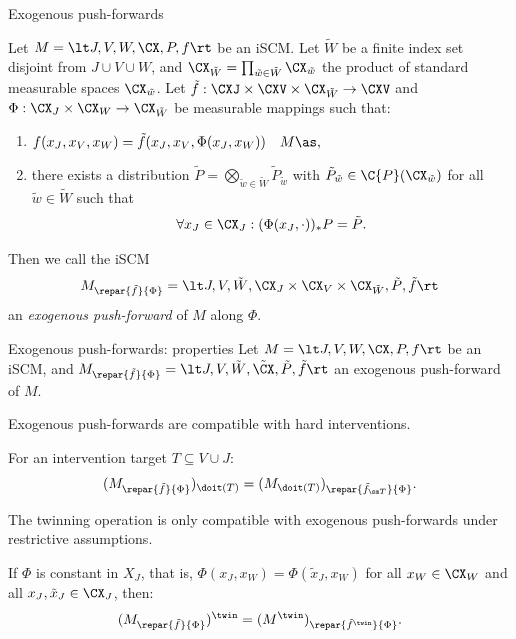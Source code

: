 \begin{frame}{Exogenous push-forwards}
\begin{Def}[\ref{def:exogenous_pushforward}]
  Let $M = \lt J, V, W, \CX, P, f \rt$ be an iSCM.
  Let $\tilde{W}$ be a finite index set disjoint from $J \cup V \cup W$, and
  $\CX_{\tilde{W}} = \prod_{\tilde{w}\in\tilde{W}} \CX_{\tilde{w}}$ the product of standard measurable spaces $\CX_{\tilde{w}}$. 
  Let $\tilde{f} : \CXJ \times \CXV \times \CX_{\tilde{W}} \to \CXV$ and $\Phi : \CX_J \times \CX_W \to \CX_{\tilde{W}}$ be measurable mappings such that:
  \begin{enumerate}
    \item $f(x_J,x_V,x_W) = \tilde{f}(x_J,x_V,\Phi(x_J,x_W)) \quad M\as,$
    \item there exists a distribution $\tilde{P} = \bigotimes_{\tilde{w}\in\tilde{W}} \tilde{P}_{\tilde{w}}$ with $\tilde{P}_{\tilde{w}} \in \C{P}(\CX_{\tilde{w}})$ for all $\tilde{w}\in\tilde{W}$ such that
    $$\forall x_J \in \CX_J: (\Phi(x_J,\cdot))_* P = \tilde{P}.$$
  \end{enumerate}
  Then we call the iSCM
  $$M_{\repar{\tilde{f}}{\Phi}} = \lt J, V, \tilde{W}, \CX_J \times \CX_V \times \CX_{\tilde{W}}, \tilde{P}, \tilde{f} \rt$$
  an \emph{exogenous push-forward} of $M$ along $\Phi$.
\end{Def}
\end{frame}

\begin{frame}{Exogenous push-forwards: properties}
Let $M = \lt J, V, W, \CX, P, f \rt$ be an iSCM, and $M_{\repar{\tilde{f}}{\Phi}} = \lt J, V, \tilde{W}, \tilde{\CX}, \tilde{P}, \tilde{f} \rt$ an exogenous push-forward of $M$.

\bigskip
Exogenous push-forwards are compatible with hard interventions.
\begin{Lem}[\ref{lem:interventions_exogenous_pushforward_commute}]
For an intervention target $T \subseteq V \cup J$:
$$(M_{\repar{\tilde{f}}{\Phi}})_{\doit(T)} = (M_{\doit(T)})_{\repar{\tilde{f}_{\sm T}}{\Phi}}.$$
\end{Lem}
The twinning operation is only compatible with exogenous push-forwards under restrictive assumptions.
\begin{Lem}[\ref{lem:twinning_exogenous_pushforward_commute}]
If $\Phi$ is constant in $X_J$, that is, $\Phi(x_J,x_W) = \Phi(\tilde{x}_J,x_W)$ for all $x_W \in \CX_W$ and all $x_J,\tilde{x}_J \in \CX_J$, then:
$$(M_{\repar{\tilde{f}}{\Phi}})^\twin = (M^\twin)_{\repar{\tilde{f}^\twin}{\Phi}}.$$
\end{Lem}
\end{frame}

